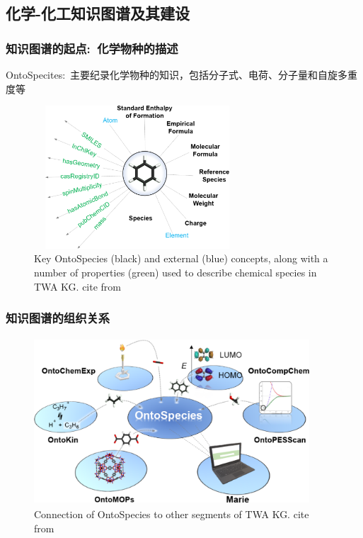 \subsection{化学-化工知识图谱及其建设}
\frame
{
	\frametitle{知识图谱的起点:~化学物种的描述}
		\textrm{OntoSpecites}:~主要纪录化学物种的知识，包括分子式、电荷、分子量和自旋多重度等
\begin{figure}[h!]
\centering
\vskip -1pt
\includegraphics[height=2.10in,width=3.05in,viewport=0 0 990 750,clip]{Figures/Key_OntoSpecies-and-external_concepts.png}
\caption{\tiny\textrm{Key OntoSpecies (black) and external (blue) concepts, along with a number of properties (green) used to describe chemical species in TWA KG. cite from~\cite{ACR56-128_2023}}}%
\label{Fig:Key-OntoSpecies-and-external-concepts}
\end{figure}
}

\frame
{
	\frametitle{知识图谱的组织关系}
\begin{figure}[h!]
\centering
\vskip -8pt
\includegraphics[height=2.45in,width=4.05in,viewport=0 0 1170 700,clip]{Figures/Connection-of-OntoSpecies-to-segments-of-KG.png}
\caption{\tiny\textrm{Connection of OntoSpecies to other segments of TWA KG. cite from~\cite{ACR56-128_2023}}}%
\label{Fig:OntoSpecies-to-segments-TWA}
\end{figure}
}

